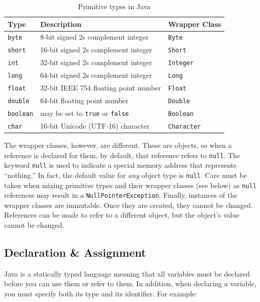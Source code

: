 \begin{table}
\centering
\begin{tabular}{l|l|l}
 Type & Description & Wrapper Class\\
\hline\hline
\texttt{byte} & 8-bit signed 2s complement integer & \texttt{Byte} \\
\texttt{short} & 16-bit signed 2s complement integer  & \texttt{Short} \\
\texttt{int} & 32-bit signed 2s complement integer & \texttt{Integer}  \\
\texttt{long} & 64-bit signed 2s complement integer  & \texttt{Long} \\
\texttt{float} & 32-bit IEEE 754 floating point number & \texttt{Float} \\
\texttt{double} & 64-bit floating point number & \texttt{Double}  \\
\texttt{boolean} & may be set to \texttt{true} or \texttt{false} & \texttt{Boolean} \\
\texttt{char} & 16-bit Unicode (UTF-16) character & \texttt{Character}  \\
\end{tabular}
\caption{Primitive types in Java}
\label{table:javaPrimitives}
\end{table}

The wrapper classes, however, are different.  These are objects, so when a reference is declared
for them, by default, that reference refers to \texttt{null}.  The keyword \texttt{null}
is used to indicate a special memory address that represents ``nothing.''  In fact, the
default value for \emph{any} object type is \texttt{null}.  Care must be taken
when mixing primitive types and their wrapper classes (see below) as \texttt{null}
references may result in a \texttt{NullPointerException}.  Finally, instances
of the wrapper classes are \gls{immutable}.  Once they are created, they cannot be changed.
References can be made to refer to a different object, but the object's value cannot
be changed.  

\subsection{Declaration \& Assignment}

Java is a statically typed language meaning that all variables must be declared
before you can use them or refer to them.  In addition, when declaring a variable, 
you must specify both its type and its identifier.  For example:

